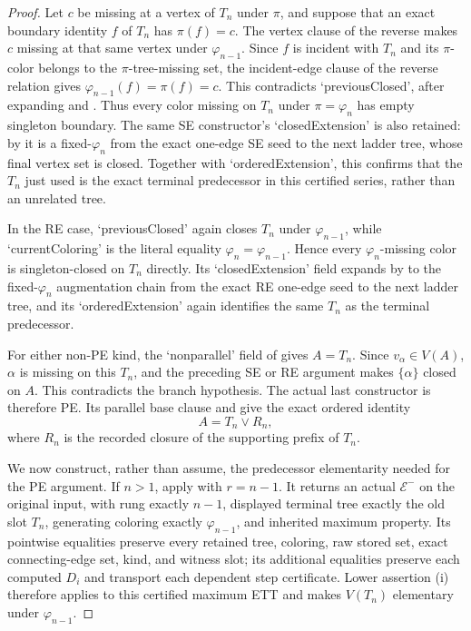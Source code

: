\begin{proof}
Let $c$ be missing at a vertex of $T_n$ under $\pi$, and suppose that an
exact boundary identity $f$ of $T_n$ has $\pi(f)=c$.  The vertex clause of
the reverse  makes $c$ missing at that same vertex
under $\varphi_{n-1}$.  Since $f$ is incident with $T_n$ and its
$\pi$-color belongs to the $\pi$-tree-missing set, the incident-edge clause
of the reverse relation gives $\varphi_{n-1}(f)=\pi(f)=c$.  This contradicts
`previousClosed', after expanding  and
.  Thus every color missing on $T_n$ under
$\pi=\varphi_n$ has empty singleton boundary.  The same SE constructor's
`closedExtension' is also retained: by  it is a
fixed-$\varphi_n$  from the exact
one-edge SE seed to the next ladder tree, whose final vertex set is closed.
Together with `orderedExtension', this confirms that the $T_n$ just used is
the exact terminal predecessor in this certified series, rather than an
unrelated tree.

In the RE case, `previousClosed' again closes $T_n$ under
$\varphi_{n-1}$, while `currentColoring' is the literal equality
$\varphi_n=\varphi_{n-1}$.  Hence every $\varphi_n$-missing color is
singleton-closed on $T_n$ directly.  Its `closedExtension' field expands by
 to the fixed-$\varphi_n$ augmentation chain from
the exact RE one-edge seed to the next ladder tree, and its
`orderedExtension' again identifies the same $T_n$ as the terminal
predecessor.

For either non-PE kind, the `nonparallel' field of
 gives $A=T_n$.  Since $v_\alpha\in V(A)$,
$\alpha$ is missing on this $T_n$, and the preceding SE or RE argument
makes $\{\alpha\}$ closed on $A$.  This contradicts the branch hypothesis.
The actual last constructor is therefore PE.  Its parallel base clause and
 give the exact ordered identity
\[
                         A=T_n\vee R_n,                         \tag{1}
\]
where $R_n$ is the recorded closure of the supporting prefix of $T_n$.

We now construct, rather than assume, the predecessor elementarity needed
for the PE argument.  If $n>1$, apply
 with $r=n-1$.  It returns an actual
$\mathcal E^{-}$ on the original input, with rung exactly $n-1$,
displayed terminal tree exactly the old slot $T_n$, generating coloring
exactly $\varphi_{n-1}$, and inherited maximum property.  Its pointwise
equalities preserve every retained tree, coloring, raw stored set, exact
connecting-edge set, kind, and witness slot; its additional equalities
preserve each computed $D_i$ and transport each dependent step
certificate.  Lower assertion (i) therefore applies to this certified
maximum ETT and makes $V(T_n)$ elementary under $\varphi_{n-1}$.


\end{proof}
